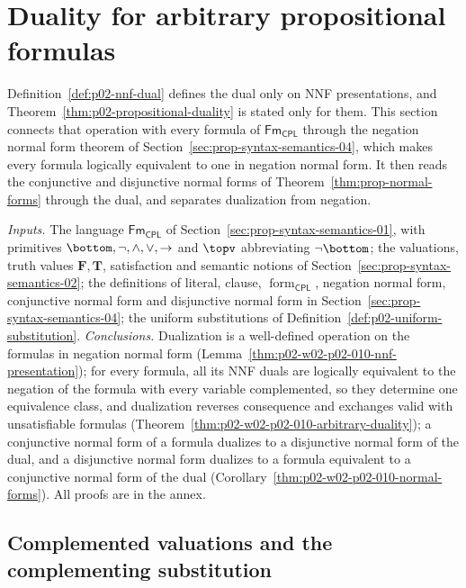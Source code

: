 \section{Duality for arbitrary propositional formulas}
\label{sec:p02-w02-p02-010-duality-arbitrary}

Definition~\ref{def:p02-nnf-dual} defines the dual only on NNF presentations,
and Theorem~\ref{thm:p02-propositional-duality} is stated only for them.  This
section connects that operation with every formula of
\(\mathsf{Fm}_{\mathsf{CPL}}\) through the negation normal form theorem of
Section~\ref{sec:prop-syntax-semantics-04}, which makes every formula
logically equivalent to one in negation normal form.  It then reads the
conjunctive and disjunctive normal forms of
Theorem~\ref{thm:prop-normal-forms} through the dual, and separates
dualization from negation.

\emph{Inputs.}  The language \(\mathsf{Fm}_{\mathsf{CPL}}\) of
Section~\ref{sec:prop-syntax-semantics-01}, with primitives
\(\bottom,\neg,\land,\lor,\to\) and \(\topv\) abbreviating \(\neg\bottom\); the
valuations, truth values \(\mathbf F,\mathbf T\), satisfaction and semantic
notions of Section~\ref{sec:prop-syntax-semantics-02}; the definitions of
literal, clause, \(\operatorname{form}_{\mathsf{CPL}}\), negation normal form,
conjunctive normal form and disjunctive normal form in
Section~\ref{sec:prop-syntax-semantics-04}; the uniform substitutions of
Definition~\ref{def:p02-uniform-substitution}.
\emph{Conclusions.}  Dualization is a well-defined operation on the formulas
in negation normal form
(Lemma~\ref{thm:p02-w02-p02-010-nnf-presentation}); for every formula, all
its NNF duals are logically equivalent to the negation of the formula with
every variable complemented, so they determine one equivalence class, and
dualization reverses consequence and exchanges valid with unsatisfiable
formulas (Theorem~\ref{thm:p02-w02-p02-010-arbitrary-duality}); a conjunctive
normal form of a formula dualizes to a disjunctive normal form of the dual,
and a disjunctive normal form dualizes to a formula equivalent to a
conjunctive normal form of the dual
(Corollary~\ref{thm:p02-w02-p02-010-normal-forms}).  All proofs are in the
annex.

\subsection{Complemented valuations and the complementing substitution}
\label{sec:p02-w02-p02-010-complement}

